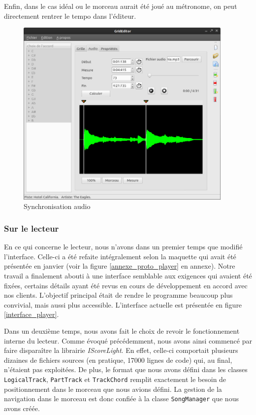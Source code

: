 Enfin, dans le cas idéal ou le morceau aurait été joué au métronome, on peut directement rentrer le tempo dans l'éditeur.
\begin{figure}[H]
\begin{center}
\includegraphics[width=400px]{editor_audiosync}
\caption{Synchronisation audio}
\label{editor_audiosync}
\end{center}
\end{figure}

\subsubsection{Sur le lecteur}

En ce qui concerne le lecteur, nous n'avons dans un premier temps que modifié l'interface. Celle-ci a été refaite intégralement selon la maquette qui avait été présentée en janvier (voir la figure \ref{annexe_proto_player} en annexe). Notre travail a finalement abouti à une interface semblable aux exigences qui avaient été fixées, certains détails ayant été revus en cours de développement en accord avec nos clients. L'objectif principal était de rendre le programme beaucoup plus convivial, mais aussi plus accessible. L'interface actuelle est présentée en figure \ref{interface_player}.

Dans un deuxième temps, nous avons fait le choix de revoir le fonctionnement interne du lecteur. Comme évoqué précédemment, nous avons ainsi commencé par faire disparaître la librairie \textit{IScoreLight}. En effet, celle-ci comportait plusieurs dizaines de fichiers sources (en pratique, 17000 lignes de code) qui, au final, n'étaient pas exploitées. De plus, le format que nous avons défini dans les classes \texttt{LogicalTrack}, \texttt{PartTrack} et \texttt{TrackChord} remplit exactement le besoin de positionnement dans le morceau que nous avions défini. La gestion de la navigation dans le morceau est donc confiée à la classe \texttt{SongManager} que nous avons créée.

